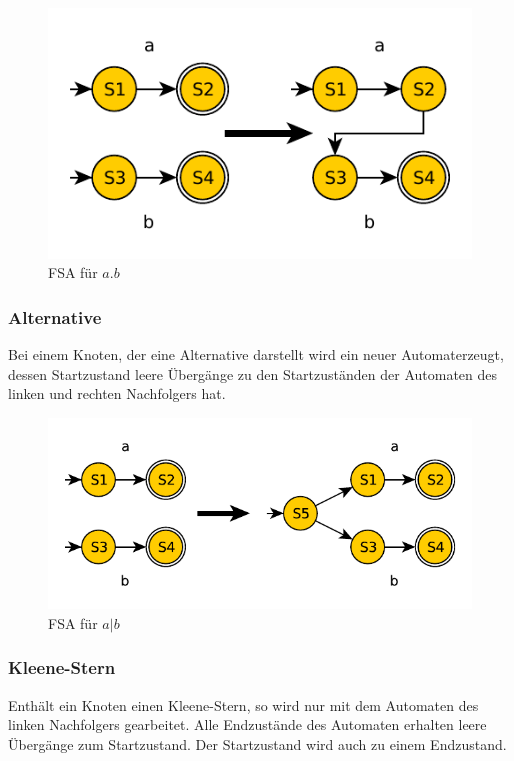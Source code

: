 \begin{figure}[h]
  \centering
  \includegraphics{objectsToInclude/re_fsa_aANDb.pdf}
  \caption{FSA für $a.b$}
\label{fig:Konkatenation}
\end{figure}

\subsubsection{Alternative}
Bei einem Knoten, der eine
Alternative darstellt wird ein neuer
Automaterzeugt, dessen
Startzustand leere Übergänge zu den
Startzuständen der Automaten des
linken und rechten Nachfolgers hat.

\begin{figure}[h]
  \centering
  \includegraphics{objectsToInclude/re_fsa_aOrb.pdf}
  \caption{FSA für $a|b$}
\label{fig:Alternative1}
\end{figure}

\subsubsection{Kleene-Stern}
Enthält ein Knoten einen Kleene-Stern, so wird nur mit dem Automaten des linken
Nachfolgers gearbeitet. Alle Endzustände des Automaten erhalten leere Übergänge
zum Startzustand. Der Startzustand wird auch zu einem Endzustand.

